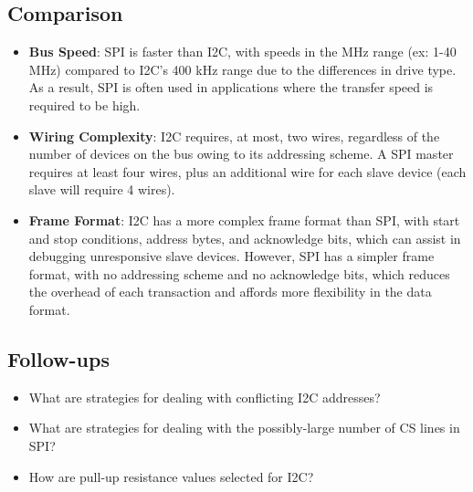 \documentclass[main.tex]{subfiles}
\begin{document}
\subsection{Comparison}
\begin{itemize}
    \item \textbf{Bus Speed}: SPI is faster than I2C, with speeds in the MHz range (ex: 1-40 MHz) compared to I2C's 400 kHz range due to the differences in drive type. As a result, SPI is often used in applications where the transfer speed is required to be high.
    \item \textbf{Wiring Complexity}: I2C requires, at most, two wires, regardless of the number of devices on the bus owing to its addressing scheme. A SPI master requires at least four wires, plus an additional wire for each slave device (each slave will require 4 wires).
    \item \textbf{Frame Format}: I2C has a more complex frame format than SPI, with start and stop conditions, address bytes, and acknowledge bits, which can assist in debugging unresponsive slave devices. However, SPI has a simpler frame format, with no addressing scheme and no acknowledge bits, which reduces the overhead of each transaction and affords more flexibility in the data format.
\end{itemize}

\subsection{Follow-ups}
\begin{itemize}
    \item What are strategies for dealing with conflicting I2C addresses?
    \item What are strategies for dealing with the possibly-large number of CS lines in SPI?
    \item How are pull-up resistance values selected for I2C?
\end{itemize}
\end{document}
